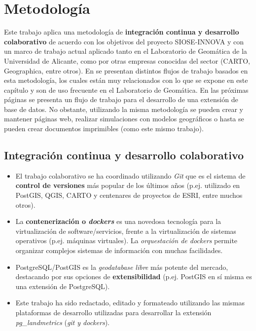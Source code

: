 
\chapter{Metodología}\label{chap:metod}

Este trabajo aplica una metodología de \textbf{integración continua y desarrollo colaborativo} de acuerdo con los objetivos del proyecto SIOSE-INNOVA y con un marco de trabajo actual aplicado tanto en el Laboratorio de Geomática de la Universidad de Alicante, como por otras empresas conocidas del sector (CARTO, Geographica, entre otros). En \citet{Zaragozi2017} se presentan distintos flujos de trabajo basados en esta metodología, los cuales están muy relacionados con lo que se expone en este capítulo y son de uso frecuente en el Laboratorio de Geomática. En las próximas páginas se presenta un flujo de trabajo para el desarrollo de una extensión de base de datos. No obstante, utilizando la misma metodología se pueden crear y mantener páginas web, realizar simulaciones con modelos geográficos o hasta se pueden crear documentos imprimibles (como este mismo trabajo).


\section{Integración continua y desarrollo colaborativo}

\begin{graybox}
\begin{itemize}
\item El trabajo colaborativo se ha coordinado utilizando \textit{Git} que es el sistema de \textbf{control de versiones} más popular de los últimos años (p.ej. utilizado en PostGIS, QGIS, CARTO y centenares de proyectos de ESRI, entre muchos otros).
\item La \textbf{contenerización o \textit{dockers}} es una novedosa tecnología para la virtualización de software/servicios, frente a la virtualización de sistemas operativos (p.ej. máquinas virtuales). La \textit{orquestación de dockers} permite organizar complejos sistemas de información con muchas facilidades.
\item PostgreSQL/PostGIS es la \textit{geodatabase libre} más potente del mercado, destacando por sus opciones de \textbf{extensibilidad} (p.ej. PostGIS en sí misma es una extensión de PostgreSQL).
\item Este trabajo ha sido redactado, editado y formateado utilizando las mismas plataformas de desarrollo utilizadas para desarrollar la extensión \textit{pg\_landmetrics} (\textit{git y dockers}).
\end{itemize}
\end{graybox}

